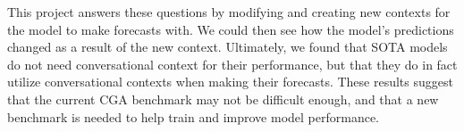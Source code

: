 This project answers these questions by modifying and creating new contexts for the model to make forecasts with. 
We could then see how the model's predictions changed as a result of the new context. 
Ultimately, we found that SOTA models do not need conversational context for their performance, but that they do in fact utilize conversational contexts when making their forecasts. 
These results suggest that the current CGA benchmark may not be difficult enough, and that a new benchmark is needed to help train and improve model performance. 
